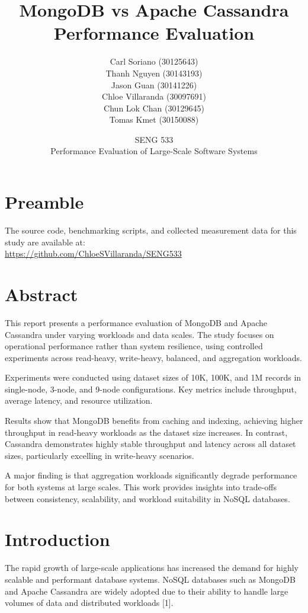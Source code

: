 \documentclass[12pt]{article}
\title{\textbf{MongoDB vs Apache Cassandra Performance Evaluation}}
\author{
Carl Soriano (30125643) \\
Thanh Nguyen (30143193) \\
Jason Guan (30141226) \\
Chloe Villaranda (30097691) \\
Chun Lok Chan (30129645) \\
Tomas Kmet (30150088)
}
\date{
SENG 533 \\
Performance Evaluation of Large-Scale Software Systems
}
\begin{document}
\maketitle
\newpage
\tableofcontents
\newpage

\section{Preamble}
The source code, benchmarking scripts, and collected measurement data for this study are available at: \\
\url{https://github.com/ChloeSVillaranda/SENG533}

\section{Abstract}

This report presents a performance evaluation of MongoDB and Apache Cassandra under varying workloads and data scales. The study focuses on operational performance rather than system resilience, using controlled experiments across read-heavy, write-heavy, balanced, and aggregation workloads.

Experiments were conducted using dataset sizes of 10K, 100K, and 1M records in single-node, 3-node, and 9-node configurations. Key metrics include throughput, average latency, and resource utilization.

Results show that MongoDB benefits from caching and indexing, achieving higher throughput in read-heavy workloads as the dataset size increases. In contrast, Cassandra demonstrates highly stable throughput and latency across all dataset sizes, particularly excelling in write-heavy scenarios.

A major finding is that aggregation workloads significantly degrade performance for both systems at large scales. This work provides insights into trade-offs between consistency, scalability, and workload suitability in NoSQL databases.

\section{Introduction}

The rapid growth of large-scale applications has increased the demand for highly scalable and performant database systems. NoSQL databases such as MongoDB and Apache Cassandra are widely adopted due to their ability to handle large volumes of data and distributed workloads [1].
\end{document}
